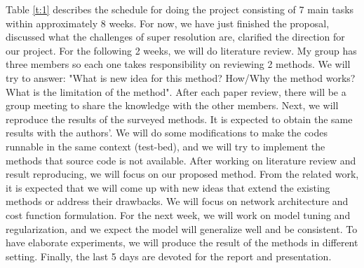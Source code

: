 \documentclass[10pt]{article}
\begin{document}
Table \ref{t:1} describes the schedule for doing the project consisting of 7 main tasks within approximately 8 weeks. For now, we have just finished the proposal, discussed what the challenges of super resolution are, clarified the direction for our project. For the following 2 weeks, we will do literature review. My group has three members so each one takes responsibility on reviewing 2 methods. We will try to answer: "What is new idea for this method? How/Why the method works? What is the limitation of the method". After each paper review, there will be a group meeting to share the knowledge with the other members. Next, we will reproduce the results of the surveyed methods. It is expected to obtain the same results with the authors'. We will do some modifications to make the codes runnable in the same context (test-bed), and we will try to implement the methods that source code is not available. After working on literature review and result reproducing, we will focus on our proposed method. From the related work, it is expected that we will come up with new ideas that extend the existing methods or address their drawbacks. We will focus on network architecture and cost function formulation. For the next week, we will work on model tuning and regularization, and we expect the model will generalize well and be consistent. To have elaborate experiments, we will produce the result of the methods in different setting. Finally, the last 5 days are devoted for the report and presentation.
\end{document}

